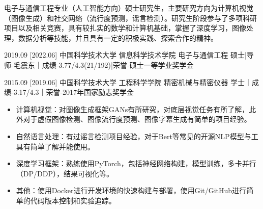 \documentclass[zh]{resume}
\begin{document}
\makeheader

{\onehalfspacing\hspace{2em}%
电子与通信工程专业（人工智能方向）硕士研究生，主要研究方向为计算机视觉（图像生成）和社交网络（流行度预测，谣言检测）。研究生阶段参与了多项科研项目以及相关竞赛，具有较扎实的数学和计算机基础，掌握了深度学习，图像处理，数据分析等技能，并且具有一定的积极实践、探索合作的精神。
\par}

\begin{competences}
\end{competences}

\begin{educations}
  \education%
    {2019.09}%
    [2022.06]%
    {中国科学技术大学}%
    {信息科学技术学院}%
    {电子与通信工程}%
    {硕士|导师-毛震东｜成绩-3.77/4.3(21/192)|荣誉-硕士一等学业奖学金}

  \separator{0.5ex}
  \education%
    {2015.09}%
    [2019.06]%
    {中国科学技术大学}%
    {工程科学学院}%
    {精密机械与精密仪器}%
    {学士｜成绩-3.17/4.3｜荣誉-2017年国家励志奖学金}
\end{educations}

\begin{itemize}
  \item 计算机视觉：对图像生成框架GANs有所研究，对底层视觉任务有所了解，此外对于虚假图像检测、图像流行度预测、图像字幕生成有简单的项目经验。
  \item 自然语言处理：有过谣言检测项目经验，对于Bert等常见的开源NLP模型与工具有简单了解并能使用。
  \item 深度学习框架：熟练使用PyTorch，包括神经网络构建，模型训练，多卡并行（DP/DDP），结果可视化等。
  \item 其他：使用Docker进行开发环境的快速构建与部署，使用Git/GitHub进行简单的代码版本控制和实验追踪。
\end{itemize}
\end{document}
